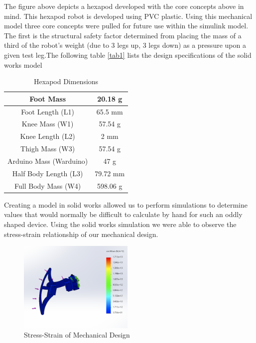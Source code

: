 The figure above depicts a hexapod developed with the core concepts above in mind. This hexapod robot is developed using PVC plastic. Using this mechanical model three core concepts were pulled for future use within the simulink model. The first is the structural safety factor determined from placing the mass of a third of the robot's weight (due to 3 legs up, 3 legs down) as a pressure upon a given test leg.The following table \ref{tab1} lists the design specifications of the solid works model

\begin{table}[htbp]
	\caption{Hexapod Dimensions}
	\begin{center}
		\begin{tabular}{|c|c|}
			\hline  
			Foot Mass & 20.18 g \\
			\hline
			Foot Length (L1) & 65.5 mm\\
			\hline
			Knee Mass (W1) & 57.54 g\\
			\hline
			Knee Length (L2) & 2 mm\\
			\hline
			Thigh Mass (W3) & 57.54 g\\
			\hline
			Arduino Mass (Warduino) & 47 g\\
			\hline
			Half Body Length (L3) & 79.72 mm\\
			\hline
			Full Body Mass (W4) & 598.06 g \\
		 	\hline
			
			
		\end{tabular}
		\end{center}
	\label{tab2}
	
\end{table}


Creating a model in solid works allowed us to perform simulations to determine values that would normally be difficult to calculate by hand for such an oddly shaped device. Using the solid works simulation we were able to observe the stress-strain relationship of our mechanical design.

\begin{figure}[h]
 \centering
   \includegraphics[width = 0.49\textwidth]{figures/4.png}                \caption{Stress-Strain of Mechanical Design}
   \label{fig:Stress-Strain of Mechanical Design}
\end{figure}



